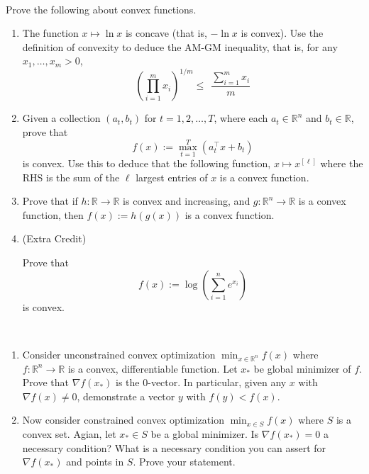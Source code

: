 \documentclass[11pt]{article}
\newcommand{\grad}{\nabla}
\newcommand{\hint}[1]{\ignore{#1}}
\newcommand{\hint}[1]{\noindent   {\texttransparent{0.5}{Hint: #1}}}
\begin{document}
\vspace{1ex}
\begin{exercise}\Coffeecup\Coffeecup~
	
Prove the following about convex functions.
	\begin{enumerate}
		\item The function $x \mapsto \ln x$ is concave (that is, $-\ln x$ is convex).
		Use the definition of convexity to deduce the AM-GM inequality, that is, for any $x_1,\ldots,x_m > 0$,
		\[
		\left(\prod_{i=1}^m x_i\right)^{1/m} \leq ~~\frac{\sum_{i=1}^m x_i}{m}
			\]
		
				
		\item Given a collection $(a_t,b_t)$ for $t = 1,2,\ldots, T$, where each $a_t \in \mathbb{R}^n$ and $b_t \in \mathbb{R}$, prove that 
		\[
			f(x) := \max_{t=1}^T (a_t^\top x + b_t)
		\]
		is convex. Use this to deduce that the following function, $x \mapsto x^{[\ell]}$ where the RHS is the sum of the $\ell$ largest entries of $x$ is a convex function.
		
		\item Prove that if $h:\mathbb{R} \to \mathbb{R}$ is  convex and increasing, and $g:\mathbb{R}^n \to \mathbb{R}$ is a convex function, then 
		$f(x) := h(g(x))$ is a convex function. 
		
		\item (Extra Credit)\Coffeecup\Coffeecup\Coffeecup~
		
		Prove that 
		\[
		f(x) := \log\left(\sum_{i=1}^n e^{x_i}\right)
		\]
		is convex.
		
		\hint{Use the Hessian}
		

	\end{enumerate}
\end{exercise}

\vspace{1ex}
\begin{exercise} \Coffeecup \Coffeecup ~
	
	\begin{enumerate}
		\item Consider unconstrained convex optimization $\min_{x\in \mathbb{R}^n} f(x)$ where $f : \mathbb{R}^n \to \mathbb{R}$ is a convex, differentiable function. Let $x_*$ be global minimizer of $f$. Prove that $\grad f(x_*)$ is the $0$-vector. 
		In particular, given any $x$ with $\grad f(x) \neq 0$, demonstrate a vector $y$ with $f(y) < f(x)$.
		
		\item Now consider constrained convex optimization $\min_{x\in S} f(x)$ where $S$ is a convex set. Agian, let $x_* \in S$ be a global minimizer.
		Is $\grad f(x_*) = 0$ a necessary condition? What is a necessary condition you can assert for $\grad f(x_*)$ and points in $S$. Prove your statement.
		
	\end{enumerate}
	
\end{exercise}
\end{document}
